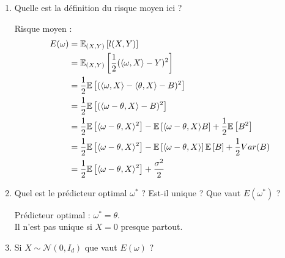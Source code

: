 \documentclass[12pt,a4paper]{article}
\begin{document}
\begin{enumerate}
    \color{black}
    \item Quelle est la définition du risque moyen ici ?
    
    \color{blue}
    Risque moyen :
    \begin{align*}
        E(\omega) &= \mathbb{E}_{(X, Y)} \left[l(X, Y)\right] \hspace{14.5cm}\\
        &= \mathbb{E}_{(X, Y)} \left[\frac{1}{2} (\langle \omega, X \rangle - Y)^2\right] \\
        &= \frac{1}{2} \mathbb{E} \left[(\langle \omega, X \rangle - \langle \theta, X \rangle - B)^2\right] \\
        &= \frac{1}{2} \mathbb{E} \left[(\langle \omega - \theta, X \rangle - B)^2\right] \\
        &= \frac{1}{2} \mathbb{E} \left[\langle \omega - \theta, X \rangle ^2 \right]
        - \mathbb{E} \left[\langle \omega - \theta, X \rangle B\right] 
        + \frac{1}{2} \mathbb{E} \left[B^2\right] \\
        &= \frac{1}{2} \mathbb{E} \left[\langle \omega - \theta, X \rangle ^2 \right]
        - \mathbb{E} \left[\langle \omega - \theta, X \rangle \right] \mathbb{E} \left[B\right]
        + \frac{1}{2} Var(B) \\
        &= \frac{1}{2} \mathbb{E} \left[\langle \omega - \theta, X \rangle ^2 \right]
        + \frac{\sigma^2 }{2} \\
    \end{align*}
    

    \color{black}
    \item Quel est le prédicteur optimal $\omega^*$ ?
    Est-il unique ?
    Que vaut $E(\omega^*)$ ?

    \color{blue}
    Prédicteur optimal : $\omega^* = \theta$.\\
    Il n'est pas unique si $X = 0$ presque partout.\\

    \color{black}
    \item Si $X \sim \mathcal{N}(0, I_d)$ que vaut $E(\omega)$ ?
    

\end{enumerate}
\end{document}
